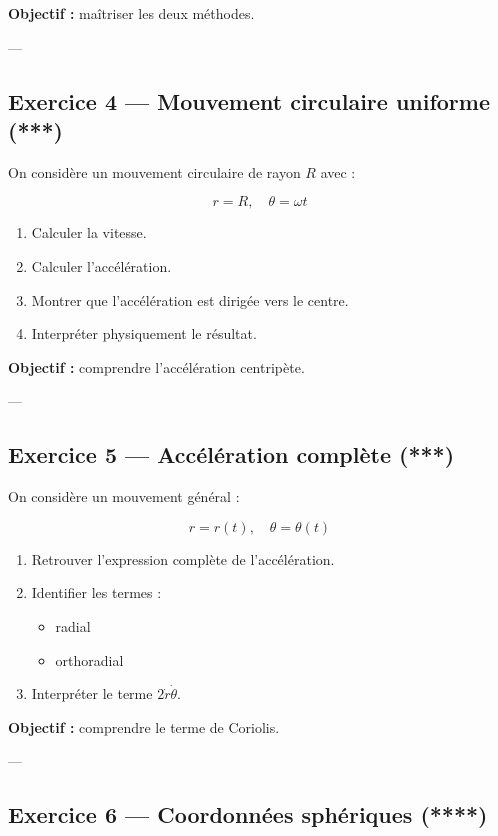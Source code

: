 \documentclass[11pt,a4paper]{article}
\begin{document}
\textbf{Objectif :} maîtriser les deux méthodes.

---

\subsection*{Exercice 4 — Mouvement circulaire uniforme (***)}

On considère un mouvement circulaire de rayon $R$ avec :

\[
r = R, \quad \theta = \omega t
\]

\begin{enumerate}
\item Calculer la vitesse.
\item Calculer l’accélération.
\item Montrer que l’accélération est dirigée vers le centre.
\item Interpréter physiquement le résultat.
\end{enumerate}

\textbf{Objectif :} comprendre l’accélération centripète.

---

\subsection*{Exercice 5 — Accélération complète (***)}

On considère un mouvement général :

\[
r = r(t), \quad \theta = \theta(t)
\]

\begin{enumerate}
\item Retrouver l’expression complète de l’accélération.
\item Identifier les termes :
\begin{itemize}
\item radial
\item orthoradial
\end{itemize}
\item Interpréter le terme $2\dot{r}\dot{\theta}$.
\end{enumerate}

\textbf{Objectif :} comprendre le terme de Coriolis.

---

\subsection*{Exercice 6 — Coordonnées sphériques (****)}
\end{document}
